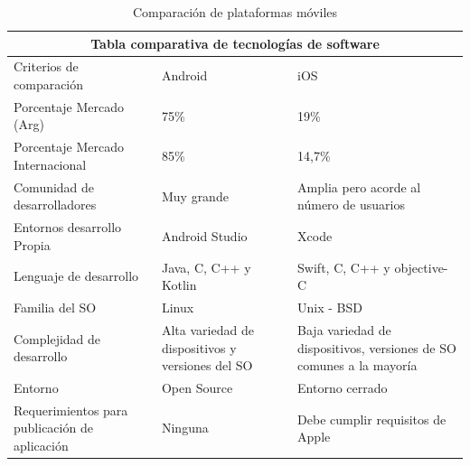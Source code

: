         \begin{table}[h]
            \centering
            \begin{tabularx}{\textwidth}{|X|X|X|}
                 \hline
                 \multicolumn{3}{|c|}{Tabla comparativa de tecnologías de software}\\
                 \hline
                 Criterios de comparación & Android & iOS \\
                 \hline
                 \hline
                 
                 Porcentaje Mercado (Arg) & 75\% & 19\%  \\
                 \hline
                 
                 Porcentaje Mercado Internacional & 85\% & 14,7\% \\
                 \hline
                 
                 Comunidad de desarrolladores & Muy grande & Amplia pero acorde al número de usuarios\\
                 \hline
                 
                  Entornos desarrollo Propia & Android Studio & Xcode\\
                 \hline
                 
                 Lenguaje de desarrollo & Java, C, C++ y Kotlin & Swift, C, C++ y objective-C\\
                 \hline
                 
                 Familia del SO & Linux & Unix - BSD\\
                 \hline
                 
                 Complejidad de desarrollo & Alta variedad de dispositivos y versiones del SO & Baja variedad de dispositivos, versiones de SO comunes a la mayoría\\
                 \hline
                 
                 Entorno & Open Source & Entorno cerrado \\
                 \hline
                 
                 Requerimientos para publicación de aplicación & Ninguna & Debe cumplir requisitos de Apple\\
                 \hline
                 
            \end{tabularx}
            \caption{Comparación de plataformas móviles}
            \label{tab:ComparacionPlataformasMoviles}
        \end{table}

